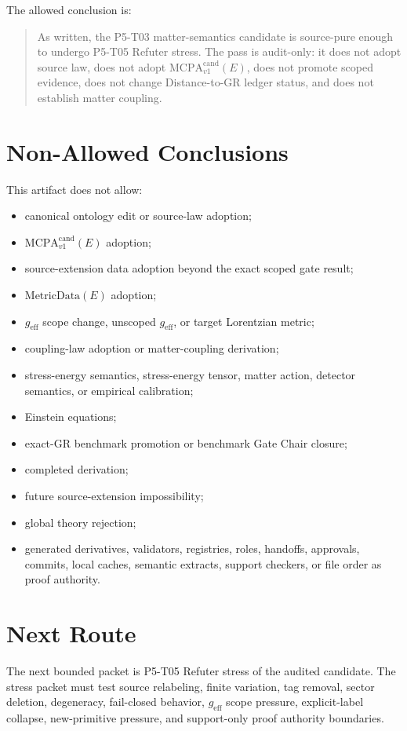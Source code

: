 \documentclass[11pt]{article}
\newcommand{\MetricData}{\mathrm{MetricData}}
\newcommand{\geff}{g_{\mathrm{eff}}}
\newcommand{\MCPA}{\mathrm{MCPA}^{\mathrm{cand}}_{v1}}
\begin{document}
The allowed conclusion is:
\begin{quote}
As written, the P5-T03 matter-semantics candidate is source-pure enough to
undergo P5-T05 Refuter stress. The pass is audit-only: it does not adopt
source law, does not adopt \(\MCPA(E)\), does not promote scoped evidence,
does not change Distance-to-GR ledger status, and does not establish matter
coupling.
\end{quote}

\section{Non-Allowed Conclusions}

This artifact does not allow:
\begin{itemize}[leftmargin=*]
\item canonical ontology edit or source-law adoption;
\item \(\MCPA(E)\) adoption;
\item source-extension data adoption beyond the exact scoped gate result;
\item \(\MetricData(E)\) adoption;
\item \(\geff\) scope change, unscoped \(\geff\), or target Lorentzian metric;
\item coupling-law adoption or matter-coupling derivation;
\item stress-energy semantics, stress-energy tensor, matter action, detector
  semantics, or empirical calibration;
\item Einstein equations;
\item exact-GR benchmark promotion or benchmark Gate Chair closure;
\item completed derivation;
\item future source-extension impossibility;
\item global theory rejection;
\item generated derivatives, validators, registries, roles, handoffs,
  approvals, commits, local caches, semantic extracts, support checkers, or
  file order as proof authority.
\end{itemize}

\section{Next Route}

The next bounded packet is P5-T05 Refuter stress of the audited candidate. The
stress packet must test source relabeling, finite variation, tag removal,
sector deletion, degeneracy, fail-closed behavior, \(\geff\) scope pressure,
explicit-label collapse, new-primitive pressure, and support-only proof
authority boundaries.
\end{document}
